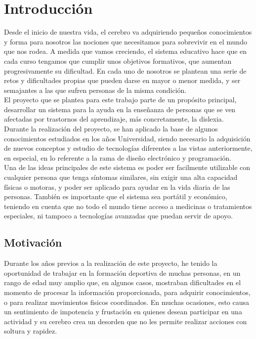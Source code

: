 \chapter{Introducción}
Desde el inicio de nuestra vida, el cerebro va adquiriendo pequeños conocimientos y forma para nosotros las nociones que necesitamos para sobrevivir en el mundo que nos rodea. A medida que vamos creciendo, el sistema educativo hace que en cada curso tengamos que cumplir unos objetivos formativos, que aumentan progresivamente su dificultad. En cada uno de nosotros se plantean una serie de retos y dificultades propias que pueden darse en mayor o menor medida, y ser semajantes a las que sufren personas de la misma condición. 
\\

El proyecto que se plantea para este trabajo parte de un propósito principal, desarrollar un sistema para la ayuda en la enseñanza de personas que se ven afectadas por trastornos del aprendizaje, más concretamente, la dislexia.
\\

Durante la realización del proyecto, se han aplicado la base de algunos conocimientos estudiados en los años Universidad, siendo necesario la adquisición de nuevos conceptos y estudio de tecnologías diferentes a las vistas anteriormente, en especial, en lo referente a la rama de diseño electrónico y programación.
\\

Una de las ideas principales de este sistema es poder ser facilmente utilizable con cualquier persona que tenga síntomas similares, sin exigir una alta capacidad físicas o motoras, y poder ser aplicado para ayudar en la vida diaria de las personas. También es importante que el sistema sea portátil y económico, teniendo en cuenta que no todo el mundo tiene acceso a medicinas o tratamientos especiales, ni tampoco a tecnologías avanzadas que puedan servir de apoyo.

\section{Motivación}
Durante los años previos a la realización de este proyecto, he tenido la oportunidad de trabajar en la formación deportiva de muchas personas, en un rango de edad muy amplio que, en algunos casos, mostraban dificultades en el momento de procesar la información proporcionada, para adquirir conocimientos, o para realizar movimientos fisicos coordinados. En muchas ocasiones, esto causa un sentimiento de impotencia y frustación en quienes desean participar en una actividad y su cerebro crea un desorden que no les permite realizar acciones con soltura y rapidez. 
\\

